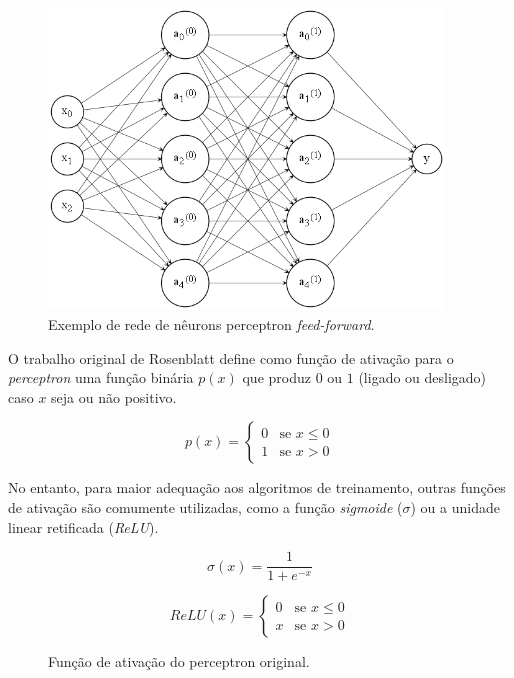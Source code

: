 \documentclass[12pt, a4paper]{article}
\begin{document}
\begin{figure}[H]
	\centering
	\includegraphics[width=\textwidth, height=8cm, keepaspectratio=true]{fig/perceptron_net}
	\caption{Exemplo de rede de nêurons perceptron \emph{feed-forward}.}
\end{figure}

O trabalho original de Rosenblatt define como função de ativação para o \emph{perceptron} uma função binária $p(x)$ que produz $0$ ou $1$ (ligado ou desligado) caso $x$ seja ou não positivo.

\begin{equation}
p(x) =
	\begin{cases}
		0 & \text{se } x \leq 0 \\
		1 & \text{se } x > 0
	\end{cases}
\end{equation}

No entanto, para maior adequação aos algoritmos de treinamento, outras funções de ativação são comumente utilizadas, como a função \emph{sigmoide} ($\sigma$) ou a unidade linear retificada (\emph{ReLU}).

\begin{equation}
\sigma(x) = \frac{1}{1 + e^{-x}}
\end{equation}

\begin{equation}
ReLU(x) =
	\begin{cases}
		0 & \text{se } x \leq 0 \\
		x & \text{se } x > 0
	\end{cases}
\end{equation}


\begin{figure}[H]
	\centering
	\caption{Função de ativação do perceptron original.}
\end{figure}
\end{document}
